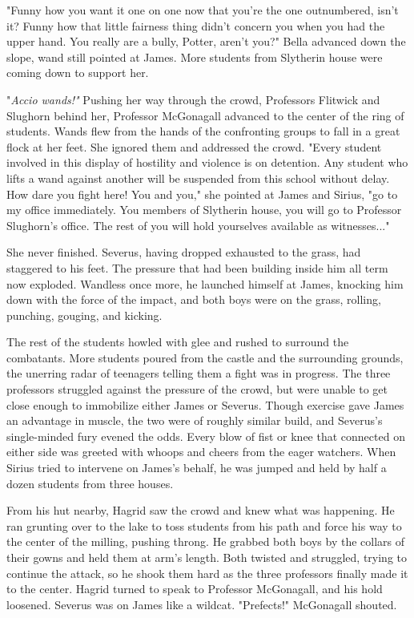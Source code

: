\documentclass[a4paper,11pt]{article}
\begin{document}
"Funny how you want it one on one now that you're the one outnumbered, isn't it? Funny how that little fairness thing didn't concern you when you had the upper hand. You really are a bully, Potter, aren't you?" Bella advanced down the slope, wand still pointed at James. More students from Slytherin house were coming down to support her.

"\emph{Accio wands!"} Pushing her way through the crowd, Professors Flitwick and Slughorn behind her, Professor McGonagall advanced to the center of the ring of students. Wands flew from the hands of the confronting groups to fall in a great flock at her feet. She ignored them and addressed the crowd. "Every student involved in this display of hostility and violence is on detention. Any student who lifts a wand against another will be suspended from this school without delay. How dare you fight here! You and you," she pointed at James and Sirius, "go to my office immediately. You members of Slytherin house, you will go to Professor Slughorn's office. The rest of you will hold yourselves available as witnesses..."

She never finished. Severus, having dropped exhausted to the grass, had staggered to his feet. The pressure that had been building inside him all term now exploded. Wandless once more, he launched himself at James, knocking him down with the force of the impact, and both boys were on the grass, rolling, punching, gouging, and kicking.

The rest of the students howled with glee and rushed to surround the combatants. More students poured from the castle and the surrounding grounds, the unerring radar of teenagers telling them a fight was in progress. The three professors struggled against the pressure of the crowd, but were unable to get close enough to immobilize either James or Severus. Though exercise gave James an advantage in muscle, the two were of roughly similar build, and Severus's single-minded fury evened the odds. Every blow of fist or knee that connected on either side was greeted with whoops and cheers from the eager watchers. When Sirius tried to intervene on James's behalf, he was jumped and held by half a dozen students from three houses.

From his hut nearby, Hagrid saw the crowd and knew what was happening. He ran grunting over to the lake to toss students from his path and force his way to the center of the milling, pushing throng. He grabbed both boys by the collars of their gowns and held them at arm's length. Both twisted and struggled, trying to continue the attack, so he shook them hard as the three professors finally made it to the center. Hagrid turned to speak to Professor McGonagall, and his hold loosened. Severus was on James like a wildcat. "Prefects!" McGonagall shouted.
\end{document}
